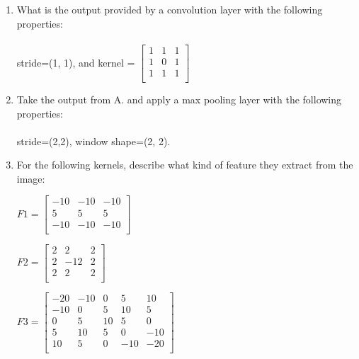 \documentclass{article}
\begin{document}
\vspace{0.5cm}
\begin{enumerate} [label=\Alph*]
    
    \item  What is the output provided by a convolution layer with the following properties: \\ \\
        stride=(1, 1), and kernel = $\begin{bmatrix}
    1 & 1 & 1 \\
    1 & 0 & 1  \\
    1 & 1 & 1 \\
    
    \end{bmatrix}$
    \item Take the output from A. and apply a max pooling layer with the following properties: \\ \\
        stride=(2,2), window shape=(2, 2).
    \item For the following kernels, describe what kind of feature they extract from the image:
    \begin{center}  
         $ F1 = \begin{bmatrix}
            -10 & -10 & -10 \\
            5 & 5 & 5  \\
            -10 & -10 & -10 \\
          \end{bmatrix}$ 
\end{center}
\begin{center}  
         $ F2 = \begin{bmatrix}
            2 & 2 & 2 \\
            2 & -12 & 2  \\
            2 & 2 & 2 \\
          \end{bmatrix}$ 
\end{center}
\begin{center}
    $ F3 = \begin{bmatrix}
        -20 & -10 & 0 & 5 &10 \\
        -10 & 0 & 5 & 10 &5 \\
        0 & 5 & 10 & 5 &0 \\
        5 & 10 & 5 & 0 &-10 \\
        10 & 5 & 0 & -10 &-20 \\
    \end{bmatrix}$ 
\end{center}

    
\end{enumerate}
\end{document}
